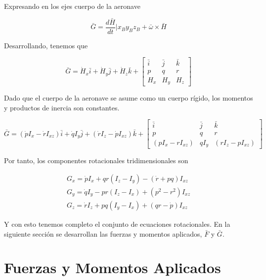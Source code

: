 Expresando en los ejes cuerpo de la aeronave 

\begin{equation}
    \bar{G} = \frac{d\bar{H}}{dt} | x_B y_B z_B + \bar{\omega} \times \bar{H}
\end{equation}

Desarrollando, tenemos que

\begin{equation}
    \bar{G} = \dot{H}_{x} \bar{i} + \dot{H}_{y} \bar{j} + \dot{H}_{z} \bar{k} + \begin{bmatrix}
    \bar{i} & \bar{j} & \bar{k} \\
    p & q & r \\
    H_{x} & H_{y} & H_{z}
    \end{bmatrix}
\end{equation}

Dado que el cuerpo de la aeronave se asume como un cuerpo rígido, los momentos y productos de inercia son constantes. 

\begin{equation}
    \bar{G} = (\dot{p} I_{x} - \dot{r} I_{xz})\bar{i} + \dot{q} I_{y}\bar{j} + (\dot{r} I_{z} - \dot{p} I_{xz})\bar{k} + \begin{bmatrix}
    \bar{i} & \bar{j} & \bar{k} \\
    p & q & r \\
    (p I_{x} - r I_{xz}) & q I_{y} & (r I_{z} - p I_{xz})
    \end{bmatrix} 
\end{equation}

Por tanto, los componentes rotacionales tridimensionales son

\begin{gather}
\label{eq: momento angular 1}
    G_x = \dot{p} I_{x} + qr (I_{z} - I_{y}) - (\dot{r} + pq) I_{xz} \\
    G_y = \dot{q} I_{y} - pr (I_{z} - I_{x}) + (p^2 - r^2) I_{xz} \\
    G_z = \dot{r} I_{z} + pq (I_{y} - I_{x}) + (qr - \dot{p}) I_{xz}
\label{eq: momento angular 2}
\end{gather}

Y con esto tenemos completo el conjunto de ecuaciones rotacionales.
En la siguiente sección se desarrollan las fuerzas y momentos aplicados, $\bar{F}$ y $\bar{G}$. 

\bigskip
\section{Fuerzas y Momentos Aplicados}


